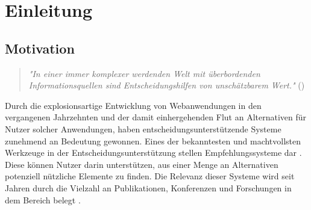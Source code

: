 \chapter{Einleitung}
\label{ch:intro}

\section{Motivation}
\label{sec:einleitungmotivation}

\begin{quotation}
    \textit{"In einer immer komplexer werdenden Welt mit überbordenden Informationsquellen sind Entscheidungshilfen von unschätzbarem Wert."} (\textcite[S. vii]{klahold:book})
\end{quotation}

Durch die explosionsartige Entwicklung von Webanwendungen in den vergangenen Jahrzehnten und der damit einhergehenden Flut an Alternativen für Nutzer solcher Anwendungen, haben entscheidungsunterstützende Systeme zunehmend an Bedeutung gewonnen.
Eines der bekanntesten und machtvollsten Werkzeuge in der Entscheidungsunterstützung stellen Empfehlungssysteme dar \cite[S. vii]{ricci:inbook}.
Diese können Nutzer darin unterstützen, aus einer Menge an Alternativen potenziell nützliche Elemente zu finden.
Die Relevanz dieser Systeme wird seit Jahren durch die Vielzahl an Publikationen, Konferenzen und Forschungen in dem Bereich belegt \cite[S. vii]{klahold:book}.


